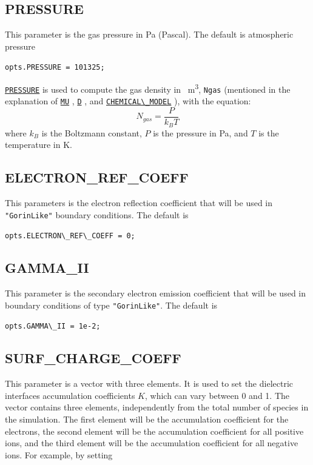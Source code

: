 \documentclass[12pt,a4paper]{article}
\newcommand{\matlabs}[1]{{\lstinline[style=MatlabStyle]!#1!}}
\newcommand{\seclink}[2]{%
	\begingroup
	\hypersetup{linkcolor=orange}%
	\hyperref[sec:#1]{\matlabs{#2}}%
	\endgroup
}
\begin{document}
	\subsection{PRESSURE}
	\label{sec:pressure}
	This parameter is the gas pressure in \unit{\pascal} (Pascal). The default is atmospheric pressure
	
	\matlabs{opts.PRESSURE = 101325;}
	
	\noindent \seclink{pressure}{PRESSURE} is used to compute the gas density in \unit{\per\cubic\meter}, \matlabs{Ngas} (mentioned in the explanation of \seclink{mu}{MU}, \seclink{d}{D}, and \seclink{chemicalmodel}{CHEMICAL\_MODEL}), with the equation:
	\[N_{gas} = \frac{P}{k_B T}\]
	where $k_B$ is the Boltzmann constant, $P$ is the pressure in \unit{\pascal}, and $T$ is the temperature in \unit{\kelvin}.
	
	\subsection{ELECTRON\_REF\_COEFF}
	\label{sec:re}
	This parameters is the electron reflection coefficient that will be used in \matlabs{"GorinLike"} boundary conditions. The default is 
	
	\matlabs{opts.ELECTRON\_REF\_COEFF = 0;}
	
	\subsection{GAMMA\_II}
	\label{sec:gammaII}
	This parameter is the secondary electron emission coefficient that will be used in boundary conditions of type \matlabs{"GorinLike"}.
	The default is
	
	\matlabs{opts.GAMMA\_II = 1e-2;}
	
	\subsection{SURF\_CHARGE\_COEFF}
	\label{sec:surfchargecoeff}
	This parameter is a vector with three elements. It is used to set the dielectric interfaces accumulation coefficients $K$, which can vary between 0 and 1.
	The vector contains three elements, independently from the total number of species in the simulation.
	The first element will be the accumulation coefficient for the electrons, the second element will be the accumulation coefficient for all positive ions, and the third element will be the accumulation coefficient for all negative ions. 
	For example, by setting
	
\end{document}
